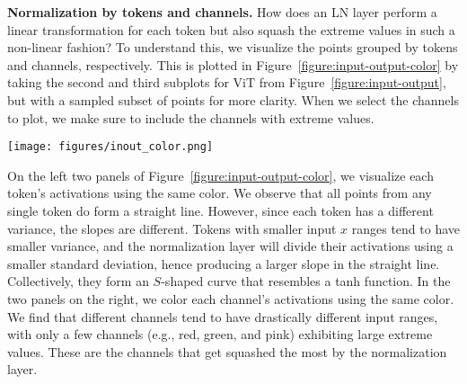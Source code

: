 \documentclass[]{fairmeta}
\renewcommand{\paragraph}[1]{\vspace{1.25mm}\noindent\textbf{#1}}
\begin{document}
\vskip 0.2cm
\paragraph{Normalization by tokens and channels.} How does an LN layer perform a linear transformation for each token but also squash the extreme values in such a non-linear fashion?
To understand this, we visualize the points grouped by tokens and channels, respectively. This is plotted in Figure~\ref{figure:input-output-color} by taking the second and third subplots for ViT from Figure~\ref{figure:input-output}, but with a sampled subset of points for more clarity. When we select the channels to plot, we make sure to include the channels with extreme values. 

\begin{figure*}[t]
\centering
\vspace{12ex}
\texttt{[image: figures/inout\_color.png]}
\vspace{2pt}
\caption{\textbf{Output vs. input of two LN layers, with tensor elements colored to indicate different channel and token dimensions.} The input tensor has a shape of (samples, tokens, and channels), with elements visualized by assigning consistent colors to the same tokens (left two panels) and channels (right two panels). \emph{Left two panels}: points representing the same token (same color) form straight lines across different channels, as LN operates linearly across channels for each token. Interestingly, when plotted collectively, these lines form a non-linear tanh-shaped curve. 
\emph{Right two panels}: each channel's input spans different ranges on the $x$-axis, contributing distinct segments to the overall tanh-shaped curve. Certain channels (e.g., red, green, and pink) exhibit more extreme $x$ values, which are squashed by LN.}
\label{figure:input-output-color}
\end{figure*}

\vskip 0.2cm
On the left two panels of Figure~\ref{figure:input-output-color}, we visualize each token's activations using the same color. We observe that all points from any single token do form a straight line. However, since each token has a different variance, the slopes are different. Tokens with smaller input $x$ ranges tend to have smaller variance, and the normalization layer will divide their activations using a smaller standard deviation, hence producing a larger slope in the straight line. Collectively, they form an $S$-shaped curve that resembles a tanh function.
In the two panels on the right, we color each channel's activations using the same color. We find that different channels tend to have drastically different input ranges, with only a few channels (e.g., red, green, and pink) exhibiting large extreme values. These are the channels that get squashed the most by the normalization layer.
\end{document}
